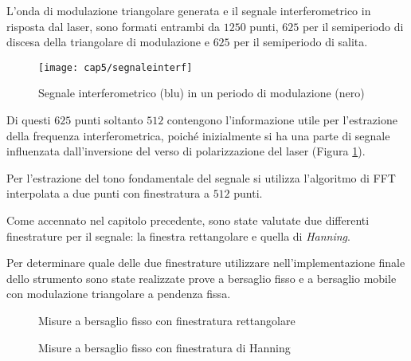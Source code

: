 L'onda di modulazione triangolare generata e il segnale interferometrico in risposta dal laser, sono formati entrambi da $1250$ punti, $625$ per il semiperiodo di discesa della triangolare di modulazione e $625$ per il semiperiodo di salita. 
\begin{figure}
  \begin{center}
    \texttt{[image: cap5/segnaleinterf]}
    \caption{Segnale interferometrico (blu) in un periodo di modulazione (nero)}
    \label{segnaleinterf}
  \end{center}
\end{figure}

Di questi $625$ punti soltanto $512$ contengono l'informazione utile per l'estrazione della frequenza interferometrica, poiché inizialmente si ha una parte di segnale influenzata dall'inversione del verso di polarizzazione del laser (Figura \ref{segnaleinterf}). 

Per l'estrazione del tono fondamentale del segnale si utilizza l'algoritmo di FFT interpolata a due punti con finestratura a $512$ punti.

Come accennato nel capitolo precedente, sono state valutate due differenti finestrature per il segnale: la finestra rettangolare e quella di \textit{Hanning}.

Per determinare quale delle due finestrature utilizzare nell'implementazione finale dello strumento sono state realizzate prove a bersaglio fisso e a bersaglio mobile con modulazione triangolare a pendenza fissa.
\begin{figure}
\centering
{}
\hspace{5mm}
\caption{Misure a bersaglio fisso con finestratura rettangolare}\label{misfisso1}
\end{figure}

\begin{figure}
\centering
{}
\hspace{5mm}
\caption{Misure a bersaglio fisso con finestratura di Hanning}\label{misfisso2}
\end{figure}

